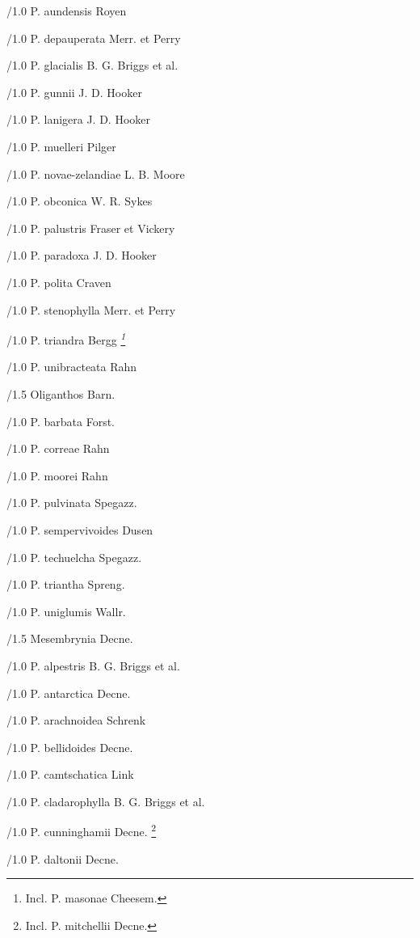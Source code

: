 \documentclass{article}
\begin{document}
\begin{classif}{1.0}
        /1.0 {P. aundensis} Royen

        /1.0 {P. depauperata} Merr. et Perry

        /1.0 {P. glacialis} B. G. Briggs et al.

        /1.0 {P. gunnii} J. D. Hooker

        /1.0 {P. lanigera} J. D. Hooker

        /1.0 {P. muelleri} Pilger

        /1.0 {P. novae-zelandiae} L. B. Moore

        /1.0 {P. obconica} W. R. Sykes

        /1.0 {P. palustris} Fraser et Vickery

        /1.0 {P. paradoxa} J. D. Hooker

        /1.0 {P. polita} Craven

        /1.0 {P. stenophylla} Merr. et Perry

        /1.0 {P. triandra} Bergg \sl \footnote{Incl. \KURN P.
        masonae Cheesem.}

        /1.0 {P. unibracteata} Rahn

/1.5 Oliganthos Barn.

        /1.0 {P. barbata} Forst.

        /1.0 {P. correae} Rahn

        /1.0 {P. moorei} Rahn

        /1.0 {P. pulvinata} Spegazz.

        /1.0 {P. sempervivoides} Dusen

        /1.0 {P. techuelcha} Spegazz.

        /1.0 {P. triantha} Spreng.

        /1.0 {P. uniglumis} Wallr.

/1.5 Mesembrynia Decne.

        /1.0 {P. alpestris} B. G. Briggs et al.

        /1.0 {P. antarctica} Decne.

        /1.0 {P. arachnoidea} Schrenk

        /1.0 {P. bellidoides} Decne.

        /1.0 {P. camtschatica} Link

        /1.0 {P. cladarophylla} B. G. Briggs et al.

        /1.0 {P. cunninghamii} Decne. \footnote{Incl. \KURN P.
        mitchellii Decne.}

        /1.0 {P. daltonii} Decne.


\end{classif}
\end{document}
